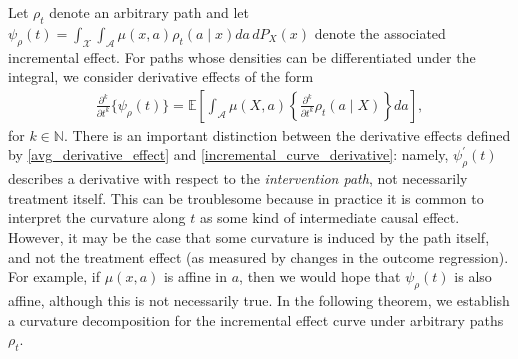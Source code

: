 \documentclass[11pt,twoside]{article}
\theoremstyle{definition}
\theoremstyle{remark}
\begin{document}
Let $\rho_t$ denote an arbitrary path and let $\psi_\rho(t) = \int_{\mathcal{X}} \int_{\mathcal{A}} \mu(x, a) \rho_t(a \! \mid \! x) da \, dP_X(x)$ denote the associated incremental effect. For paths whose densities can be differentiated under the integral, we consider derivative effects of the form
\begin{align} \label{incremental_curve_derivative}
    \frac{\partial^k}{\partial t^k} \big\{ \psi_\rho(t) \big\} =  \mathbb{E}\! \left[ \int_{\mathcal{A}} \mu(X,a) \left\{ \frac{\partial^k}{\partial t^k}\rho_t(a \! \mid \! X) \right\} da \right],
\end{align}
for $k \in \mathbb{N}$. There is an important distinction between the derivative effects defined by \cref{avg_derivative_effect} and \cref{incremental_curve_derivative}: namely, $\psi^\prime_\rho(t)$ describes a derivative with respect to the \textit{intervention path}, not necessarily treatment itself. This can be troublesome because in practice it is common to interpret the curvature along $t$ as some kind of intermediate causal effect. However, it may be the case that some curvature is induced by the path itself, and not the treatment effect (as measured by changes in the outcome regression). For example, if $\mu(x, a)$ is affine in $a$, then we would hope that $\psi_\rho(t)$ is also affine, although this is not necessarily true. In the following theorem, we establish a curvature decomposition for the incremental effect curve under arbitrary paths $\rho_t$.
\end{document}
